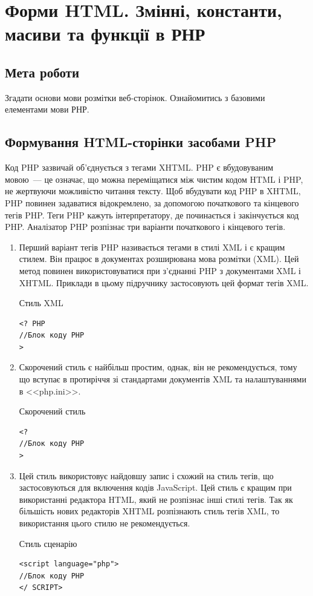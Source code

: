 \chapter{Форми HTML. Змінні, константи, масиви та функції в РНР}
\section*{Мета роботи}
Згадати основи мови розмітки веб-сторінок. Ознайомитись з базовими елементами мови РНР.
\nopagebreak[4]
\section{Формування HTML-сторінки засобами PHP}
\nopagebreak[4]
Код PHP зазвичай об'єднується з тегами XHTML. PHP є вбудовуваним мовою~--- це означає, що можна переміщатися між чистим кодом HTML і PHP, не жертвуючи можливістю читання тексту.
Щоб вбудувати код PHP в XHTML, PHP повинен задаватися відокремлено, за допомогою початкового та кінцевого тегів PHP. Теги PHP кажуть інтерпретатору, де починається і закінчується код PHP. Аналізатор PHP розпізнає три варіанти початкового і кінцевого тегів.

\begin{enumerate}



\item Перший варіант тегів PHP називається тегами в стилі XML і є кращим стилем. Він працює в документах розширювана мова розмітки (XML). Цей метод повинен використовуватися при з'єднанні PHP з документами XML і XHTML. Приклади в цьому підручнику застосовують цей формат тегів XML.

Стиль XML
\begin{verbatim}
<? PHP
//Блок коду PHP
>
\end{verbatim}

    
\item Скорочений стиль є найбільш простим, однак, він не рекомендується, тому що вступає в протиріччя зі стандартами документів XML та налаштуваннями в <<php.ini>>.

Скорочений стиль    
\begin{verbatim}
<?
//Блок коду PHP
>
\end{verbatim}

    
\item Цей стиль використовує найдовшу запис і схожий на стиль тегів, що застосовуються для включення кодів JavaScript. Цей стиль є кращим при використанні редактора HTML, який не розпізнає інші стилі тегів. Так як більшість нових редакторів XHTML розпізнають стиль тегів XML, то використання цього стилю не рекомендується.

Стиль сценарію
\begin{verbatim}
<script language="php">
//Блок коду PHP
</ SCRIPT>
\end{verbatim}
   
\end{enumerate}

